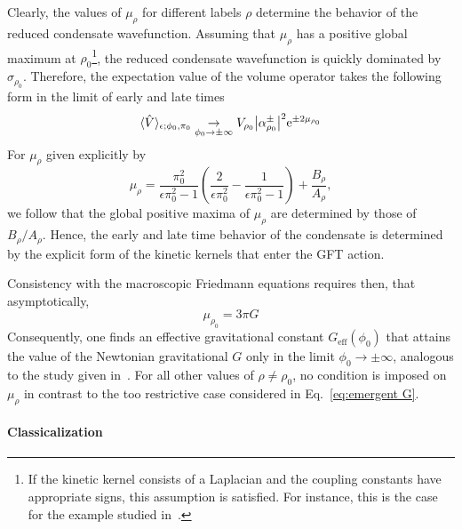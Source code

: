 \documentclass[11pt,a4paper]{article}
\newcommand{\e}{\textrm{e}}
\begin{document}
Clearly, the values of $\mu_{\rho}$ for different labels $\rho$ determine the behavior of the reduced condensate wavefunction. Assuming that $\mu_{\rho}$ has a positive global maximum at $\rho_0$\footnote{If the kinetic kernel consists of a Laplacian and the coupling constants have appropriate signs, this assumption is satisfied. For instance, this is the case for the example studied in~\cite{Gielen:2016uft}.}, the reduced condensate wavefunction is quickly dominated by $\sigma_{\rho_0}$. Therefore, the expectation value of the volume operator takes the following form in the limit of early and late times
%
\begin{equation}
\langle\hat{V}\rangle_{\epsilon;\phi_0,\pi_0}
\underset{\phi_0\rightarrow\pm\infty}{\rightarrow}V_{\rho_0}\abs{\alpha_{\rho_0}^{\pm}}^2\e^{\pm 2\mu_{\rho_0}}
\end{equation}
%
For $\mu_{\rho}$ given explicitly by
%
\begin{equation}
\mu_{\rho}
=
\frac{\pi_0^2}{\epsilon\pi_0^2-1}\left(\frac{2}{\epsilon\pi_0^2}-\frac{1}{\epsilon\pi_0^2-1}\right)+\frac{B_{\rho}}{A_{\rho}},
\end{equation}
%
we follow that the global positive maxima of $\mu_{\rho}$ are determined by those of $B_{\rho}/A_{\rho}$. Hence, the early and late time behavior of the condensate is determined by the explicit form of the kinetic kernels that enter the GFT action.

Consistency with the macroscopic Friedmann equations requires then, that asymptotically,
%
\begin{equation}
\mu_{\rho_0} = 3\pi G
\end{equation} 
%
Consequently, one finds an effective gravitational constant $G_{\text{eff}}(\phi_0)$ that attains the value of the Newtonian gravitational $G$ only in the limit $\phi_0\rightarrow\pm\infty$, analogous to the study given in~\cite{deCesare:2016rsf}. For all other values of $\rho\neq\rho_0$, no condition is imposed on $\mu_{\rho}$ in contrast to the too restrictive case considered in Eq.~\eqref{eq:emergent G}. 

\paragraph{Classicalization}
\end{document}
